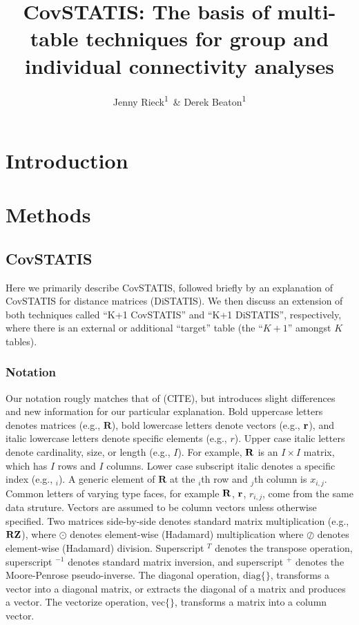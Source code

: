 \documentclass[man]{apa6}
\title{CovSTATIS: The basis of multi-table techniques for group and individual
connectivity analyses}
\author{Jenny Rieck\textsuperscript{1}~\& Derek Beaton\textsuperscript{1}}
\date{}
\affiliation{
\vspace{0.5cm}
\textsuperscript{1} Rotman Research Institute, Baycrest Health Sciences}
\theoremstyle{definition}
\theoremstyle{definition}
\theoremstyle{definition}
\theoremstyle{remark}
\begin{document}
\maketitle

\hypertarget{introduction}{%
\section{Introduction}\label{introduction}}

\hypertarget{methods}{%
\section{Methods}\label{methods}}

\hypertarget{covstatis}{%
\subsection{CovSTATIS}\label{covstatis}}

Here we primarily describe CovSTATIS, followed briefly by an explanation
of CovSTATIS for distance matrices (DiSTATIS). We then discuss an
extension of both techniques called \enquote{K+1 CovSTATIS} and
\enquote{K+1 DiSTATIS}, respectively, where there is an external or
additional \enquote{target} table (the \enquote{\(K+1\)} amongst \(K\)
tables).

\hypertarget{notation}{%
\subsubsection{Notation}\label{notation}}

Our notation rougly matches that of (CITE), but introduces slight
differences and new information for our particular explanation. Bold
uppercase letters denotes matrices (e.g., \(\mathbf{R}\)), bold
lowercase letters denote vectors (e.g., \(\bf{r}\)), and italic
lowercase letters denote specific elements (e.g., \(r\)). Upper case
italic letters denote cardinality, size, or length (e.g., \(I\)). For
example, \({\bf R}\) is an \(I \times I\) matrix, which has \(I\) rows
and \(I\) columns. Lower case subscript italic denotes a specific index
(e.g., \(_i\)). A generic element of \(\mathbf{R}\) at the \(_{i}\)th
row and \(_{j}\)th column is \(x_{i,j}\). Common letters of varying type
faces, for example \({\bf R}\), \(\bf{r}\), \(r_{i,j}\), come from the
same data struture. Vectors are assumed to be column vectors unless
otherwise specified. Two matrices side-by-side denotes standard matrix
multiplication (e.g., \(\bf{R}\bf{Z}\)), where \(\odot\) denotes
element-wise (Hadamard) multiplication where \(\oslash\) denotes
element-wise (Hadamard) division. Superscript \(^{T}\) denotes the
transpose operation, superscript \(^{-1}\) denotes standard matrix
inversion, and superscript \(^{+}\) denotes the Moore-Penrose
pseudo-inverse. The diagonal operation, \(\mathrm{diag\{\}}\),
transforms a vector into a diagonal matrix, or extracts the diagonal of
a matrix and produces a vector. The vectorize operation,
\(\mathrm{vec\{\}}\), transforms a matrix into a column vector.
\end{document}
